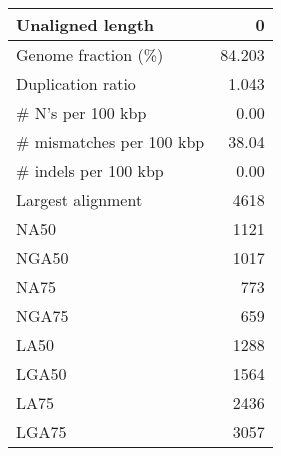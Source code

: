 \documentclass[12pt,a4paper]{article}
\begin{document}
\begin{table}[ht]
\begin{center}
\begin{tabular}{|l*{1}{|r}|}
Unaligned length & 0 \\ \hline
Genome fraction (\%) & 84.203 \\ \hline
Duplication ratio & 1.043 \\ \hline
\# N's per 100 kbp & 0.00 \\ \hline
\# mismatches per 100 kbp & 38.04 \\ \hline
\# indels per 100 kbp & 0.00 \\ \hline
Largest alignment & 4618 \\ \hline
NA50 & 1121 \\ \hline
NGA50 & 1017 \\ \hline
NA75 & 773 \\ \hline
NGA75 & 659 \\ \hline
LA50 & 1288 \\ \hline
LGA50 & 1564 \\ \hline
LA75 & 2436 \\ \hline
LGA75 & 3057 \\ \hline
\end{tabular}
\end{center}
\end{table}
\end{document}
